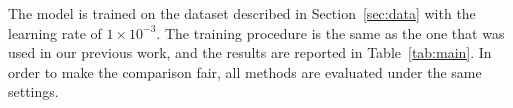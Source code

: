 The model is trained on the dataset described in Section~\ref{sec:data} with the learning rate of $1\times 10^{-3}$. The training procedure is the same as the one that was used in our previous work, and the results are reported in Table~\ref{tab:main}. In order to make the comparison fair, all methods are evaluated under the same settings.
